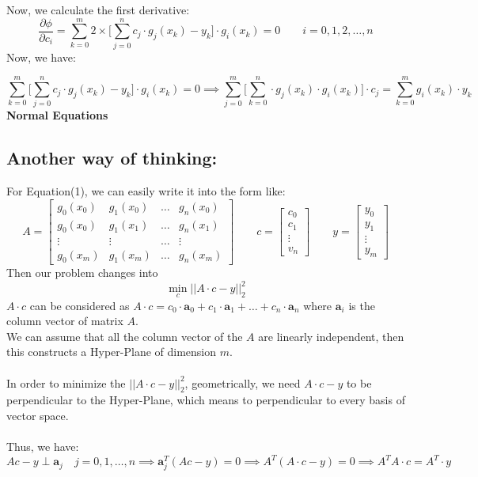 \documentclass [9 pt]{article}
\theoremstyle{definition}
\begin{document}
Now, we calculate the first derivative:
$$ \dfrac{\partial \phi}{\partial c_i} = \sum_{k = 0}^m 2 \times \bigg[ \sum_{j = 0}^n c_j \cdot g_j(x_k) - y_k \bigg] \cdot g_i(x_k) = 0 \quad\quad i = 0, 1, 2, \ldots , n $$
Now, we have:

\begin{equation}
	\sum_{k = 0}^m  \bigg[ \sum_{j = 0}^n c_j \cdot g_j(x_k) - y_k \bigg] \cdot g_i(x_k) = 0  \implies \sum_{j = 0}^m  \bigg[ \sum_{k = 0}^n\cdot g_j(x_k)\cdot g_i(x_k)\bigg] \cdot c_j = \sum_{k = 0}^m g_i(x_k)\cdot y_k 
\end{equation}
\textbf{Normal Equations}

\subsection*{Another way of thinking:}
For Equation(1), we can easily write it into the form like:
$$ A = \begin{bmatrix}
	g_0(x_0) & g_1(x_0) & \ldots & g_n(x_0)\\
	g_0(x_0) & g_1(x_1) & \ldots & g_n(x_1)\\
	\vdots 	 & \vdots 	& \ldots & \vdots\\
	g_0(x_m) & g_1(x_m) & \ldots & g_n(x_m)
\end{bmatrix}  
\quad\quad
c = \begin{bmatrix}
	c_0\\
	c_1\\
	\vdots\\
	v_n
\end{bmatrix}
\quad\quad
y = \begin{bmatrix}
	y_0\\
	y_1\\
	\vdots\\
	y_m
\end{bmatrix}
$$
Then our problem changes into $$ \min_{c} || A \cdot c - y||_2^2$$
$A \cdot c$ can be considered as $A\cdot c = c_0 \cdot \textbf{a}_0 + c_1 \cdot \textbf{a}_1 + \ldots + c_n \cdot \textbf{a}_n$ where $\textbf{a}_i$ is the column vector of  matrix $A$.\\
We can assume that all the column vector of the $A$ are linearly independent, then this constructs a Hyper-Plane of dimension $m$.\\
\\
In order to minimize the $|| A\cdot c - y ||_2^2$, geometrically, we need $A\cdot c - y $ to be perpendicular to the Hyper-Plane, which means to perpendicular to every basis of vector space.  
\\
\\
Thus, we have: 
$$Ac - y \perp \textbf{a}_j \quad  j = 0, 1, \ldots ,n \implies \textbf{a}_j^T (Ac - y) = 0  \implies A^T (A\cdot c - y) = 0 \implies A^TA \cdot c = A^T \cdot y $$
\end{document}
